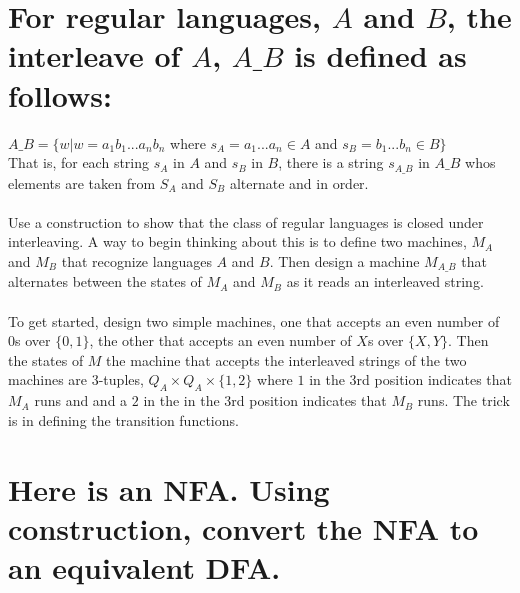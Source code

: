 \documentclass{article}
\begin{document}
\section{For regular languages, $A$ and $B$, the interleave of $A$, $A\_B$ is defined as follows:}

$A\_B = \{w | w = a_1 b_1 ... a_n b_n$ where $s_A = a_1 ... a_n \in A $ and $s_B = b_1 ... b_n \in B\}$
\\
That is, for each string $s_A$ in $A$ and $s_B$ in $B$, there is a string $s_{A\_B}$ in $A\_B$ whos elements are taken from $S_A$ and $S_B$ alternate and in order.
\\
\\
Use a construction to show that the class of regular languages is closed under interleaving.  A way to begin thinking about this is to define two machines, $M_A$ and $M_B$ that recognize languages $A$ and $B$.  Then design a machine $M_{A\_B}$ that alternates between the states of $M_A$ and $M_B$ as it reads an interleaved string.
\\
\\
To get started, design two simple machines, one that accepts an even number of 0s over $\{0,1\}$, the other that accepts an even number of $X$s over $\{X,Y\}$. Then the states of $M$ the machine that accepts the interleaved strings of the two machines are 3-tuples, $Q_A \times Q_A \times \{1,2\}$ where $1$ in the 3rd position indicates that $M_A$ runs and and a $2$ in the in the 3rd position indicates that $M_B$ runs. The trick is in defining the transition functions.

\section{Here is an NFA. Using construction, convert the NFA to an equivalent DFA.}

\begin{center}
\end{center}
\end{document}
